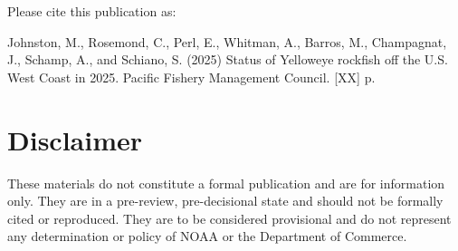 \documentclass[
]{scrartcl}
\renewcommand*\contentsname{Table of contents}
\newcommand\contentsname{Table of contents}
\begin{document}
\begin{titlepage}
\begin{minipage}[b][\textheight][s]{\textwidth}
  \end{minipage}
  \restoregeometry
  \end{titlepage}

\renewcommand*\contentsname{Table of contents}
{
\hypersetup{linkcolor=}
\setcounter{tocdepth}{3}
\tableofcontents
}

\newpage{}

Please cite this publication as:

Johnston, M., Rosemond, C., Perl, E., Whitman, A., Barros, M.,
Champagnat, J., Schamp, A., and Schiano, S. (2025) Status of Yelloweye
rockfish off the U.S. West Coast in 2025. Pacific Fishery Management
Council. {[}XX{]} p.

\newpage{}

\setcounter{page}{1}

\renewcommand{\thetable}{\roman{table}}
\renewcommand{\thefigure}{\roman{figure}}

\section*{Disclaimer}\label{disclaimer}

These materials do not constitute a formal publication and are for
information only. They are in a pre-review, pre-decisional state and
should not be formally cited or reproduced. They are to be considered
provisional and do not represent any determination or policy of NOAA or
the Department of Commerce.

\newpage{}
\end{document}
